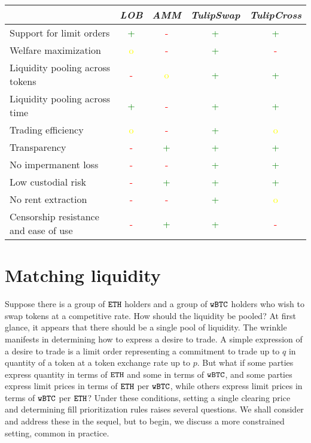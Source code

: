 \documentclass[11pt, reqno]{amsart}
\theoremstyle{definition}
\theoremstyle{remark}
\newcommand{\BTC}{\textnormal{\texttt{wBTC}}}
\newcommand{\ETH}{\textnormal{\texttt{ETH}}}
\newcommand{\trm}{\textcolor{red}{-}}
\newcommand{\tyo}{\textcolor{yellow}{o}}
\newcommand{\tgp}{\textcolor{green}{+}}
\begin{document}
\begin{samepage}
    \begin{table}[h!]
        \centering
        \begin{tabular}{l|c|c|c|c|}
                                                  & \emph{LOB} & \emph{AMM} & \emph{TulipSwap} & \emph{TulipCross} \\
            \hline
            Support for limit orders              & \tgp & \trm & \tgp & \tgp \\
            \hline
            Welfare maximization                  & \tyo & \trm & \tgp & \trm \\
            \hline
            Liquidity pooling across tokens       & \trm & \tyo & \tgp & \tgp \\
            \hline
            Liquidity pooling across time         & \tgp & \trm & \tgp & \tgp \\
            \hline
            Trading efficiency                    & \tyo & \trm & \tgp & \tyo \\
            \hline
            Transparency                          & \trm & \tgp & \tgp & \tgp \\
            \hline
            No impermanent loss                   & \trm & \trm & \tgp & \tgp \\
            \hline
            Low custodial risk                    & \trm & \tgp & \tgp & \tgp \\
            \hline
            No rent extraction                    & \trm & \trm & \tgp & \tyo \\
            \hline
            Censorship resistance and ease of use & \trm & \tgp & \tgp & \trm \\
            \hline
        \end{tabular}
    \end{table}
\end{samepage}

\section{Matching liquidity}
Suppose there is a group of $\ETH$ holders and a group of $\BTC$ holders who
wish to swap tokens at a competitive rate.
How should the liquidity be pooled? At first glance, it appears that
there should be a single pool of liquidity. The wrinkle manifests in determining
how to express a desire to trade. A simple expression of a desire to trade is
a limit order representing a commitment to trade up to $q$ in quantity of
a token at a token exchange rate up to $p$. But what if some parties express
quantity in terms of $\ETH$ and some in terms of $\BTC$, and some parties
express limit prices in terms of $\ETH$ per $\BTC$, while others express limit
prices in terms of $\BTC$ per $\ETH$? Under these conditions, setting a single
clearing price and determining fill prioritization rules raises several
questions. We shall consider and address these in the sequel, but to begin, we
discuss a more constrained setting, common in practice.
\end{document}
